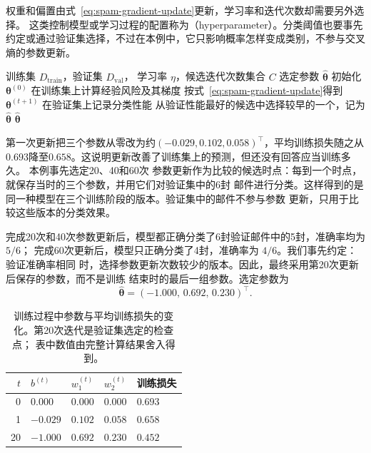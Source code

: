 权重和偏置由式~\eqref{eq:spam-gradient-update}更新，学习率和迭代次数却需要另外选择。
这类控制模型或学习过程的配置称为（hyperparameter）。分类阈值也要事先
约定或通过验证集选择，不过在本例中，它只影响概率怎样变成类别，不参与交叉熵的参数更新。

\begin{algorithm}[垃圾邮件分类器的训练]
  \label{alg:spam-training}
  \begin{algorithmic}[1]
    \Require 训练集 $D_{\mathrm{train}}$，验证集 $D_{\mathrm{val}}$，
      学习率 $\eta$，候选迭代次数集合 $C$
    \Ensure 选定参数 $\hat{\bm{\theta}}$
    \State 初始化 $\bm{\theta}^{(0)}$
      \State 在训练集上计算经验风险及其梯度
      \State 按式~\eqref{eq:spam-gradient-update}得到 $\bm{\theta}^{(t+1)}$
        \State 在验证集上记录分类性能
      \EndIf
    \EndFor
    \State 从验证性能最好的候选中选择较早的一个，记为 $\hat{\bm{\theta}}$
    \State \Return $\hat{\bm{\theta}}$
  \end{algorithmic}
\end{algorithm}

第一次更新把三个参数从零改为约$(-0.029,0.102,0.058)^{\top}$，平均训练损失随之从
$0.693$降至$0.658$。这说明更新改善了训练集上的预测，但还没有回答应当训练多久。
本例事先选定20、40和60次
参数更新作为比较的候选时点：每到一个时点，就保存当时的三个参数，并用它们对验证集中的6封
邮件进行分类。这样得到的是同一种模型在三个训练阶段的版本。验证集中的邮件不参与参数
更新，只用于比较这些版本的分类效果。

完成20次和40次参数更新后，模型都正确分类了6封验证邮件中的5封，准确率均为 $5/6$；
完成60次更新后，模型只正确分类了4封，准确率为 $4/6$。我们事先约定：验证准确率相同
时，选择参数更新次数较少的版本。因此，最终采用第20次更新后保存的参数，而不是训练
结束时的最后一组参数。选定参数为
\begin{equation}
  \hat{\bm{\theta}}=(-1.000,\,0.692,\,0.230)^{\top}.
  \label{eq:spam-fitted-parameters}
\end{equation}

\begin{table}[htbp]
  \centering
  \small
  \begin{tabularx}{\linewidth}{@{}rXXXX@{}}
    \toprule
    $t$ & $b^{(t)}$ & $w_1^{(t)}$ & $w_2^{(t)}$ & 训练损失 \\
    \midrule
    0  & $0.000$  & $0.000$ & $0.000$ & $0.693$ \\
    1  & $-0.029$ & $0.102$ & $0.058$ & $0.658$ \\
    20 & $-1.000$ & $0.692$ & $0.230$ & $0.452$ \\
    \bottomrule
  \end{tabularx}
  \caption{训练过程中参数与平均训练损失的变化。第20次迭代是验证集选定的检查点；
  表中数值由完整计算结果舍入得到。}
  \label{tab:spam-training-record}
\end{table}


